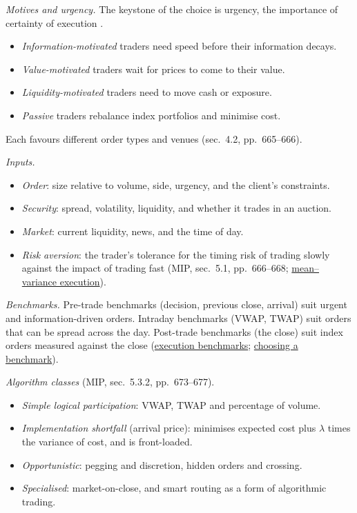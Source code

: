 \begin{qfmethod}\label{meth:trade-strategy-selection}
 \emph{Motives and urgency.} The keystone of the choice is urgency, the importance of certainty of execution \citep[chap.~10, sec.~4, pp.~663--667]{managing-investment-portfolios-2007}.
\begin{itemize}
\item \emph{Information-motivated} traders need speed before their information decays.
\item \emph{Value-motivated} traders wait for prices to come to their value.
\item \emph{Liquidity-motivated} traders need to move cash or exposure.
\item \emph{Passive} traders rebalance index portfolios and minimise cost.
\end{itemize}
Each favours different order types and venues (sec.~4.2, pp.~665--666).

\emph{Inputs.}
\begin{itemize}
\item \emph{Order}: size relative to volume, side, urgency, and the client's constraints.
\item \emph{Security}: spread, volatility, liquidity, and whether it trades in an auction.
\item \emph{Market}: current liquidity, news, and the time of day.
\item \emph{Risk aversion}: the trader's tolerance for the timing risk of trading slowly against the impact of trading fast (MIP, sec.~5.1, pp.~666--668; \hyperref[mod:almgren-chriss-execution]{mean--variance execution}).
\end{itemize}
\emph{Benchmarks.} Pre-trade benchmarks (decision, previous close, arrival) suit urgent and information-driven orders. Intraday benchmarks (VWAP, TWAP) suit orders that can be spread across the day. Post-trade benchmarks (the close) suit index orders measured against the close (\hyperref[def:execution-benchmark]{execution benchmarks}; \hyperref[meth:algorithm-benchmark-choice]{choosing a benchmark}).

\emph{Algorithm classes} (MIP, sec.~5.3.2, pp.~673--677).
\begin{itemize}
\item \emph{Simple logical participation}: VWAP, TWAP and percentage of volume.
\item \emph{Implementation shortfall} (arrival price): minimises expected cost plus $\lambda$ times the variance of cost, and is front-loaded.
\item \emph{Opportunistic}: pegging and discretion, hidden orders and crossing.
\item \emph{Specialised}: market-on-close, and smart routing as a form of algorithmic trading.
\end{itemize}


\end{qfmethod}
